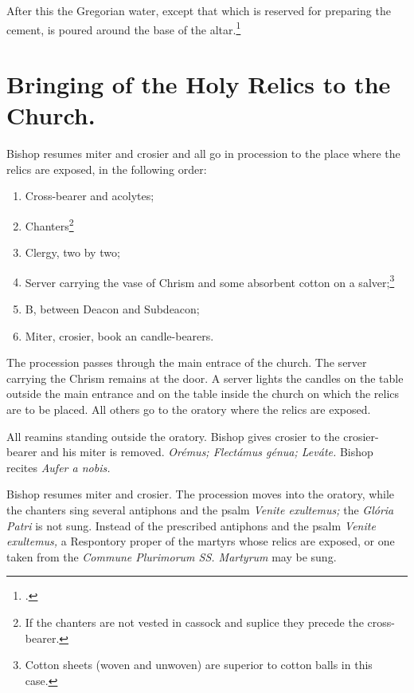 \documentclass[letterpaper]{report}
\begin{document}
{After this the Gregorian water, except that which is reserved for preparing the
cement, is poured around the base of the altar.\footcite[If much water remains
only a small quantity of it is poured around the base of the altar, and what is
left is afterwards poured into the \textit{secrarium.}][footnote 1, p.
78.]{consecranda}

\section{Bringing of the Holy Relics to the Church.}

\rubric Bishop resumes miter and crosier and all go in procession to the place where
the relics are exposed, in the following order:

\begin{enumerate}
    \item Cross-bearer and acolytes;
    \item Chanters\footnote{If the chanters are not vested in cassock and
        suplice they precede the cross-bearer.}
    \item Clergy, two by two;
    \item Server carrying the vase of Chrism and some absorbent cotton on a
        salver;\footnote{Cotton sheets (woven and unwoven) are superior to
        cotton balls in this case.}
    \item B, between Deacon and Subdeacon;
    \item Miter, crosier, book an candle-bearers.
\end{enumerate}

The procession passes through the main entrace of the church. The server
carrying the Chrism remains at the door. A server lights the candles on the
table outside the main entrance and on the table inside the church on which the
relics are to be placed. All others go to the oratory where the relics are
exposed.

\rubric All reamins standing outside the oratory. Bishop gives crosier to the
crosier-bearer and his miter is removed. \textit{Orémus; Flectámus génua;
Leváte.} Bishop recites \textit{Aufer a nobis.}

\rubric Bishop resumes miter and crosier. The procession moves into the oratory,
while the chanters sing several antiphons and the psalm \textit{Venite
exultemus;} the \textit{Glória Patri} is not sung. Instead of the prescribed
antiphons and the psalm \textit{Venite exultemus,} a Respontory proper of the
martyrs whose relics are exposed, or one taken from the \textit{Commune
Plurimorum SS. Martyrum} may be sung.

}
\end{document}
